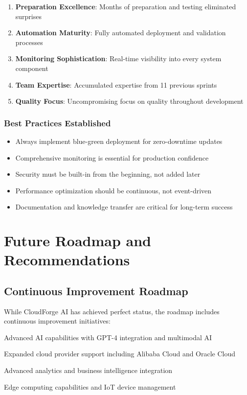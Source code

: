 \begin{enumerate}
    \item \textbf{Preparation Excellence}: Months of preparation and testing eliminated surprises
    \item \textbf{Automation Maturity}: Fully automated deployment and validation processes
    \item \textbf{Monitoring Sophistication}: Real-time visibility into every system component
    \item \textbf{Team Expertise}: Accumulated expertise from 11 previous sprints
    \item \textbf{Quality Focus}: Uncompromising focus on quality throughout development
\end{enumerate}

\subsubsection{Best Practices Established}

\begin{itemize}
    \item Always implement blue-green deployment for zero-downtime updates
    \item Comprehensive monitoring is essential for production confidence
    \item Security must be built-in from the beginning, not added later
    \item Performance optimization should be continuous, not event-driven
    \item Documentation and knowledge transfer are critical for long-term success
\end{itemize}

\section{Future Roadmap and Recommendations}

\subsection{Continuous Improvement Roadmap}

While CloudForge AI has achieved perfect status, the roadmap includes continuous improvement initiatives:

\begin{description}[leftmargin=*]
    \item[Q1 2026] Advanced AI capabilities with GPT-4 integration and multimodal AI
    \item[Q2 2026] Expanded cloud provider support including Alibaba Cloud and Oracle Cloud
    \item[Q3 2026] Advanced analytics and business intelligence integration
    \item[Q4 2026] Edge computing capabilities and IoT device management
\end{description}

